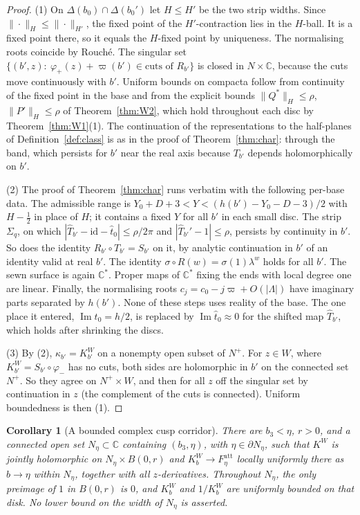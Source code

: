 \documentclass[11pt]{amsart}
\newtheorem{corollary}[theorem]{Corollary}
\theoremstyle{definition}
\newcommand{\Rr}{R}
\newcommand{\Kk}{K}
\begin{document}
\begin{proof}
(1) On $\Delta(b_0)\cap\Delta(b_0')$ let $H\le H'$ be the two strip widths.
Since $\|\cdot\|_H\le\|\cdot\|_{H'}$, the fixed point of the $H'$-contraction
lies in the $H$-ball.  It is a fixed point there, so it equals the
$H$-fixed point by uniqueness.  The normalising roots coincide by Rouch\'e.
The singular set $\{(b',z):\ \varphi_+(z)+\varpi(b')\in\text{cuts of }\Rr_{b'}\}$
is closed in $N\times\mathbb C$, because the cuts move continuously with $b'$.  Uniform bounds on compacta follow
from continuity of the fixed point in the base and from the explicit bounds
$\|Q^*\|_H\le\rho$, $\|P'\|_H\le\rho$ of Theorem~\ref{thm:W2}, which hold
throughout each disc by Theorem~\ref{thm:W1}(1).  The continuation of the
representations to the half-planes of Definition~\ref{def:class} is as in the
proof of Theorem~\ref{thm:char}: through the band, which persists for $b'$
near the real axis because $T_{b'}$ depends holomorphically on $b'$.

(2) The proof of Theorem~\ref{thm:char} runs verbatim with the following
per-base data.  The admissible range is
$Y_0+D+3<Y<(h(b')-Y_0-D-3)/2$ with $H-\tfrac12$ in place of $H$; it contains a
fixed $Y$ for all $b'$ in each small disc.  The strip $\Sigma_q$, on which
$|\hat T_{b'}-\mathrm{id}-\hat t_0|\le\rho/2\pi$ and $|\hat T_{b'}'-1|\le\rho$, persists
by continuity in $b'$.  So does the identity $\Rr_{b'}\circ T_{b'}=S_{b'}$ on
it, by analytic continuation in $b'$ of an identity valid at real $b'$.  The identity $\sigma\circ\Rr(w)=\sigma(1)\lambda^w$
holds for all $b'$.  The sewn surface is again $\mathbb C^*$.  Proper maps of
$\mathbb C^*$ fixing the ends with local degree one are linear.  Finally, the
normalising roots $c_j=c_0-j\varpi+O(|\Lambda|)$ have imaginary parts
separated by $h(b')$.  None of these steps uses reality of the base.  The one place it entered,
$\operatorname{Im}t_0=h/2$, is replaced by $\operatorname{Im}\hat t_0\approx0$ for the
shifted map $\hat T_{b'}$, which holds after shrinking the discs.

(3) By (2), $\kappa_{b'}=\Kk^W_{b'}$ on a nonempty open subset of $N^+$.  For
$z\in W$, where $\Kk^W_{b'}=S_{b'}\circ\varphi_-$ has no cuts, both sides are
holomorphic in $b'$ on the connected set $N^+$.  So they agree on
$N^+\times W$, and then for all $z$ off the singular set by continuation
in $z$ (the complement of the cuts is connected).  Uniform boundedness is then (1).
\end{proof}

\begin{corollary}[A bounded complex cusp corridor]\label{cor:cusp-corridor}
There are $b_3<\eta$, $r>0$, and a connected open set
$N_\eta\subset\mathbb C$ containing $(b_3,\eta)$, with
$\eta\in\partial N_\eta$, such that $\Kk^W$ is jointly holomorphic on
$N_\eta\times B(0,r)$ and
$\Kk_b^W\to F_\eta^{\mathrm{att}}$ locally uniformly there as
$b\to\eta$ within $N_\eta$, together with all $z$-derivatives.
Throughout $N_\eta$, the only preimage of $1$ in $B(0,r)$ is $0$,
and $\Kk_b^W$ and $1/\Kk_b^W$ are uniformly bounded on that disk.
No lower bound on the width of $N_\eta$ is asserted.
\end{corollary}
\end{document}

